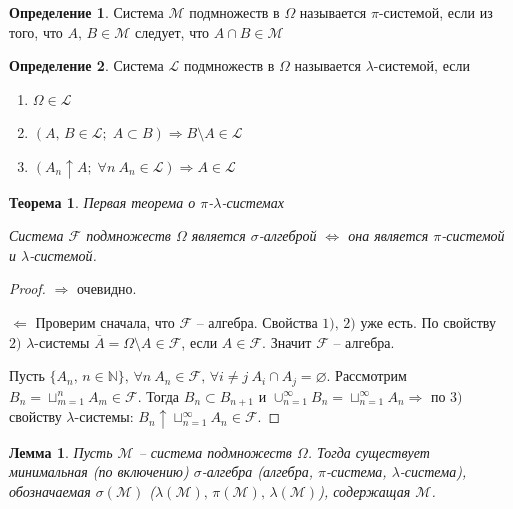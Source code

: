 \documentclass[a4paper,12pt]{article}
\renewcommand{\emptyset}{\ensuremath{\varnothing}}
\theoremstyle{plain}
\newtheorem{theorem}{Теорема}[section]
\newtheorem{lemma}{Лемма}[section]
\theoremstyle{definition}
\newtheorem{definition}{Определение}[section]
\theoremstyle{remark}
\begin{document}
\begin{definition}
	Система $\mathcal{M}$ подмножеств в $\Omega$ называется $\pi$-системой, если из того, что $A,\, B \in \mathcal{M}$ следует, что $A \cap B \in \mathcal{M}$
\end{definition}

\begin{definition}
	Система $\mathcal{L}$ подмножеств в $\Omega$ называется $\lambda$-системой, если
	\begin{enumerate}
		\item $\Omega \in \mathcal{L}$
		\item $(A,\, B \in \mathcal{L};\; A \subset B) \Rightarrow B \setminus A \in \mathcal{L}$
		\item $(A_n \uparrow A;\; \forall n \: A_n \in \mathcal{L}) \Rightarrow A \in \mathcal{L}$
	\end{enumerate}
\end{definition}

\begin{theorem} \label{FIRST_SYSTEM_TH}
	Первая теорема о $\pi$-$\lambda$-системах

	Система $\mathcal{F}$ подмножеств $\Omega$ является $\sigma$-алгеброй $\Leftrightarrow$ она является $\pi$-системой и $\lambda$-системой.
\end{theorem}

\begin{proof}
	$\Rightarrow$ очевидно.

	$\Leftarrow$ Проверим сначала, что $\mathcal{F}$ -- алгебра. Свойства $1),\,2)$ уже есть. По свойству $2)$ $\lambda$-системы $\overline{A} = \Omega \setminus A \in \mathcal{F}$, если $A \in \mathcal{F}$. Значит $\mathcal{F}$ -- алгебра.

	Пусть $\{A_n,\, n \in \mathbb{N}\},\, \forall n \: A_n \in \mathcal{F},\, \forall i \neq j \: A_i \cap A_j = \emptyset$. Рассмотрим $B_n = \sqcup_{m = 1}^n A_m \in \mathcal{F}$. Тогда $B_n \subset B_{n + 1}$ и $\cup_{n = 1}^\infty B_n = \sqcup_{n = 1}^\infty A_n \Rightarrow$ по $3)$ свойству $\lambda$-системы: $B_n \uparrow \sqcup_{n = 1}^\infty A_n \in \mathcal{F}$.
\end{proof}

\begin{lemma}
	Пусть $\mathcal{M}$ -- система подмножеств $\Omega$. Тогда существует минимальная (по включению) $\sigma$-алгебра (алгебра, $\pi$-система, $\lambda$-система), обозначаемая $\sigma(\mathcal{M})$ ($\lambda(\mathcal{M}),\, \pi(\mathcal{M}),\, \lambda(\mathcal{M})$), содержащая $\mathcal{M}$.
\end{lemma}
\end{document}
